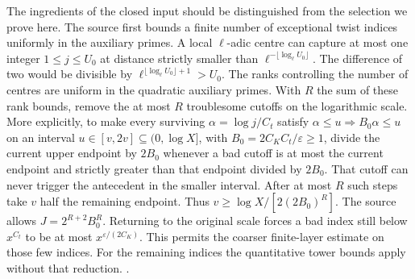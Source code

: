The ingredients of the closed input should be distinguished from the selection we prove here. The source first bounds a finite number of exceptional twist indices uniformly in the auxiliary primes. A local \(\ell\)-adic centre can capture at most one integer \(1\le j\le U_0\) at distance strictly smaller than \(\ell^{-\lfloor\log_\ell U_0\rfloor}\). The difference of two would be divisible by \(\ell^{\lfloor\log_\ell U_0\rfloor+1}>U_0\). The ranks controlling the number of centres are uniform in the quadratic auxiliary primes. With \(R\) the sum of these rank bounds, remove the at most \(R\) troublesome cutoffs on the logarithmic scale. More explicitly, to make every surviving \(\alpha=\log j/C_t\) satisfy \(\alpha\le u\Rightarrow B_0\alpha\le u\) on an interval \(u\in[v,2v]\subseteq(0,\log X]\), with \(B_0=2C_KC_t/\varepsilon\ge1\), divide the current upper endpoint by \(2B_0\) whenever a bad cutoff is at most the current endpoint and strictly greater than that endpoint divided by \(2B_0\). That cutoff can never trigger the antecedent in the smaller interval. After at most \(R\) such steps take \(v\) half the remaining endpoint. Thus \(v\ge\log X/[2(2B_0)^R]\). The source allows \(J=2^{R+2}B_0^R\). Returning to the original scale forces a bad index still below \(x^{C_t}\) to be at most \(x^{\varepsilon/(2C_K)}\). This permits the coarser finite-layer estimate on those few indices. For the remaining indices the quantitative tower bounds apply without that reduction. \quad
{}\quad
{}.

